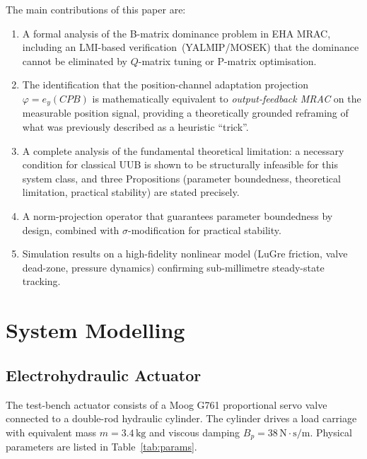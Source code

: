 \documentclass[12pt,a4paper]{article}
\theoremstyle{plain}
\theoremstyle{definition}
\theoremstyle{remark}
\newcommand{\eph}{\varphi}      %
\begin{document}
The main contributions of this paper are:
\begin{enumerate}
  \item A formal analysis of the B-matrix dominance problem in EHA
    MRAC, including an LMI-based verification~(YALMIP/MOSEK) that the
    dominance cannot be eliminated by $Q$-matrix tuning or
    P-matrix optimisation.
  \item The identification that the position-channel adaptation
    projection $\eph=e_y(CPB)$ is mathematically equivalent to
    \emph{output-feedback MRAC} on the measurable position signal,
    providing a theoretically grounded reframing of what was
    previously described as a heuristic ``trick''.
  \item A complete analysis of the fundamental theoretical limitation:
    a necessary condition for classical UUB is shown to be
    structurally infeasible for this system class, and three
    Propositions (parameter boundedness, theoretical limitation,
    practical stability) are stated precisely.
  \item A norm-projection operator that guarantees parameter
    boundedness by design, combined with $\sigma$-modification for
    practical stability.
  \item Simulation results on a high-fidelity nonlinear model
    (LuGre friction, valve dead-zone, pressure dynamics) confirming
    sub-millimetre steady-state tracking.
\end{enumerate}

\section{System Modelling}
\label{sec:model}

\subsection{Electrohydraulic Actuator}

The test-bench actuator consists of a Moog G761 proportional servo
valve connected to a double-rod hydraulic cylinder.  The cylinder
drives a load carriage with equivalent mass $m=3.4\,\mathrm{kg}$ and
viscous damping $B_p=38\,\mathrm{N\cdot s/m}$.  Physical parameters
are listed in Table~\ref{tab:params}.
\end{document}
